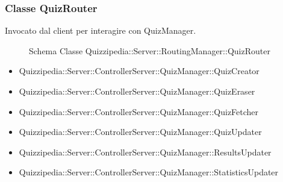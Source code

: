 \subsubsection{Classe QuizRouter}
Invocato dal client per interagire con QuizManager.
\begin{figure}[H]
\centering
\noindent{}
\caption[Schema Classe QuizRouter]{Schema Classe Quizzipedia::Server::RoutingManager::QuizRouter}
\end{figure}
\begin{itemize}
\item Quizzipedia::Server::ControllerServer::QuizManager::QuizCreator
\item Quizzipedia::Server::ControllerServer::QuizManager::QuizEraser
\item Quizzipedia::Server::ControllerServer::QuizManager::QuizFetcher
\item Quizzipedia::Server::ControllerServer::QuizManager::QuizUpdater
\item Quizzipedia::Server::ControllerServer::QuizManager::ResultsUpdater
\item Quizzipedia::Server::ControllerServer::QuizManager::StatisticsUpdater
\end{itemize}
